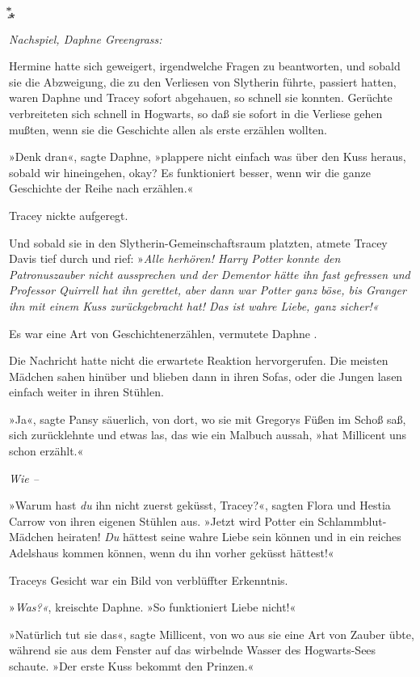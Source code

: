 {͙⃰⁎

\emph{Nachspiel, Daphne Greengrass:}

Hermine hatte sich geweigert, irgendwelche Fragen zu beantworten, und sobald sie die Abzweigung, die zu den Verliesen von Slytherin führte, passiert hatten, waren Daphne und Tracey sofort abgehauen, so schnell sie konnten. Gerüchte verbreiteten sich schnell in Hogwarts, so daß sie sofort in die Verliese gehen mußten, wenn sie die Geschichte allen als erste erzählen wollten.

»Denk dran«, sagte Daphne, »plappere nicht einfach was über den Kuss heraus, sobald wir hineingehen, okay? Es funktioniert besser, wenn wir die ganze Geschichte der Reihe nach erzählen.«

Tracey nickte aufgeregt.

Und sobald sie in den Slytherin-Gemeinschaftsraum platzten, atmete Tracey Davis tief durch und rief: »\emph{Alle herhören! Harry Potter konnte den Patronuszauber nicht aussprechen und der Dementor hätte ihn fast gefressen und Professor Quirrell hat ihn gerettet, aber dann war Potter ganz böse, bis Granger ihn mit einem Kuss zurückgebracht hat! Das ist wahre Liebe, ganz sicher!«}

Es war eine Art von Geschichtenerzählen, vermutete Daphne .

Die Nachricht hatte nicht die erwartete Reaktion hervorgerufen. Die meisten Mädchen sahen hinüber und blieben dann in ihren Sofas, oder die Jungen lasen einfach weiter in ihren Stühlen.

»Ja«, sagte Pansy säuerlich, von dort, wo sie mit Gregorys Füßen im Schoß saß, sich zurücklehnte und etwas las, das wie ein Malbuch aussah, »hat Millicent uns schon erzählt.«

\emph{Wie --}

»Warum hast \emph{du} ihn nicht zuerst geküsst, Tracey?«, sagten Flora und Hestia Carrow von ihren eigenen Stühlen aus. »Jetzt wird Potter ein Schlammblut-Mädchen heiraten! \emph{Du} hättest seine wahre Liebe sein können und in ein reiches Adelshaus kommen können, wenn du ihn vorher geküsst hättest!«

Traceys Gesicht war ein Bild von verblüffter Erkenntnis.

»\emph{Was?«}, kreischte Daphne. »So funktioniert Liebe nicht!«

»Natürlich tut sie das«, sagte Millicent, von wo aus sie eine Art von Zauber übte, während sie aus dem Fenster auf das wirbelnde Wasser des Hogwarts-Sees schaute. »Der erste Kuss bekommt den Prinzen.«

}
